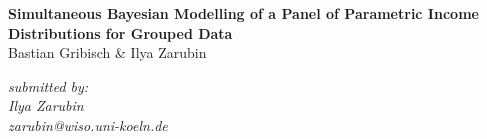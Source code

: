 \documentclass[a4paper,12pt]{scrartcl} %
\begin{document}




\begin{titlepage}

\thispagestyle{empty}   %


\begin{center}
\vspace*{2.cm}
{\textbf{\large{Simultaneous Bayesian Modelling of a Panel of
Parametric Income Distributions for Grouped Data}}} \\
\vspace*{2cm}
Bastian Gribisch \& Ilya Zarubin\\

\end{center}


\vfill
\begin{flushright}
   \emph{submitted by:} \\
   \emph{Ilya Zarubin} \\
   \vspace*{0.5cm}
   \emph{zarubin@wiso.uni-koeln.de}\\
\end{flushright}


\end{titlepage}

\clearpage                %




\clearpage
\clearpage

\end{document}
